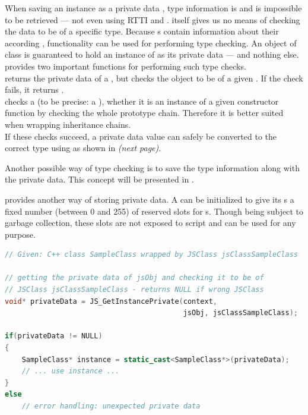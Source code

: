 When saving an instance as a private data , type information is  and is impossible to be retrieved --- not even using RTTI and .  itself gives us no means of checking the data to be of a specific type. Because s contain information about their according ,  functionality can be used for performing type checking. An object of class  is guaranteed to hold an instance of  as its private data --- and nothing else.  provides two important functions for performing such type checks.\\
 returns the private data of a , but checks the object to be of a given . If the check fails, it returns .\\
 checks a  (to be precise: a ), whether it is an instance of a given constructor function by checking the whole prototype chain. Therefore it is better suited when wrapping inheritance chains.\\
If these checks succeed, a private data value can safely be converted to the correct  type using  as shown in  \textit{(next page)}.

Another possible way of type checking is to save the type information along with the private data. This concept will be presented in .

 provides another way of storing private data. A  can be initialized to give its s a fixed number (between 0 and 255) of reserved slots for s. Though being subject to garbage collection, these slots are not exposed to script and can be used for any purpose.

\SingleSpacing
\begin{lstlisting}[language=C++, caption=Unwrapping private data, label=lst:UnwrappingPriv]
// Given: C++ class SampleClass wrapped by JSClass jsClassSampleClass

// getting the private data of jsObj and checking it to be of 
// JSClass jsClassSampleClass - returns NULL if wrong JSClass
void* privateData = JS_GetInstancePrivate(context, 
                                          jsObj, jsClassSampleClass);

if(privateData != NULL)
{
	SampleClass* instance = static_cast<SampleClass*>(privateData);
	// ... use instance ...
}
else
	// error handling: unexpected private data
\end{lstlisting}
\OnehalfSpacing

